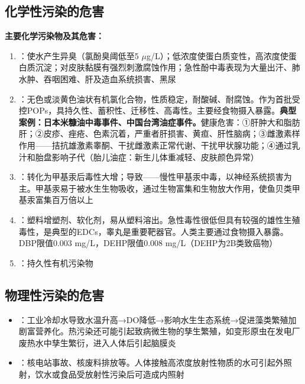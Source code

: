 \documentclass[10pt,a4paper,oneside]{ctexbook}
\begin{document}
\subsection{化学性污染的危害}

\begin{keybox}
\textbf{主要化学污染物及其危害：}

\begin{enumerate}[leftmargin=*]
    \item {}：使水产生异臭（氯酚臭阈低至5 $\mu$g/L）；低浓度使蛋白质变性，高浓度使蛋白质沉淀；对皮肤黏膜有强烈刺激腐蚀作用；急性酚中毒表现为大量出汗、肺水肿、吞咽困难、肝及造血系统损害、黑尿
    \item {}：无色或淡黄色油状有机氯化合物，性质稳定，耐酸碱、耐腐蚀。作为首批受控POPs，具持久性、蓄积性、迁移性、高毒性。主要经食物摄入暴露。\textbf{典型案例：日本米糠油中毒事件、中国台湾油症事件。}健康危害：①肝肿大和脂肪肝；②皮疹、痤疮、色素沉着，严重者肝损害、黄疸、肝性脑病；③雌激素样作用——拮抗雄激素睾酮、干扰雌激素正常代谢、干扰甲状腺功能；④通过乳汁和胎盘影响子代（胎儿油症：新生儿体重减轻、皮肤颜色异常）
    \item {}：转化为甲基汞后毒性大增；导致——慢性甲基汞中毒，以神经系统损害为主。甲基汞易于被水生生物吸收，通过生物富集和生物放大作用，使鱼贝类甲基汞富集百万倍以上
    \item {}：塑料增塑剂、软化剂，易从塑料溶出。急性毒性很低但具有较强的雄性生殖毒性，是典型的EDCs，睾丸是重要靶器官。人类主要通过食物摄入暴露。DBP限值0.003 mg/L，DEHP限值0.008 mg/L（DEHP为2B类致癌物）
    \item {}：持久性有机污染物
\end{enumerate}
\end{keybox}

\subsection{物理性污染的危害}

\begin{itemize}[leftmargin=*]
    \item {}：工业冷却水导致水温升高→DO降低→影响水生生态系统→促进藻类繁殖加剧富营养化。热污染还可能引起致病微生物的孳生繁殖，如变形原虫在发电厂废热水中孳生繁衍，进入人体后引起脑膜炎
    \item {}：核电站事故、核废料排放等。人体接触高浓度放射性物质的水可引起外照射，饮水或食品受放射性污染后可造成内照射
\end{itemize}
\end{document}
